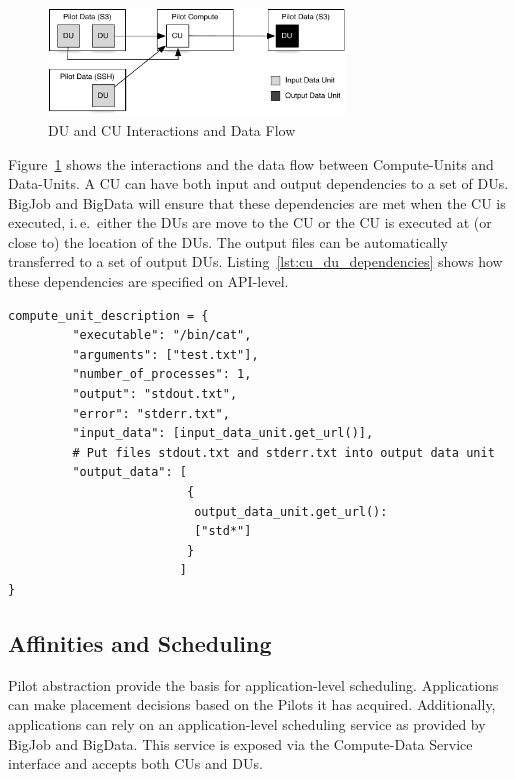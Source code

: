 \documentclass[times]{cpeauth}
\newcommand{\pilot}{Pilot\xspace}
\newcommand{\pilots}{Pilots\xspace}
\newcommand{\computedataservice}{Compute-Data Service\xspace}
\newcommand{\computeunit}{Compute-Unit\xspace}
\newcommand{\computeunits}{Compute-Units\xspace}
\newcommand{\dataunit}{Data-Unit\xspace}
\newcommand{\dataunits}{Data-Units\xspace}
\newcommand{\dus}{DUs\xspace}
\newcommand{\cu}{CU\xspace}
\newcommand{\cus}{CUs\xspace}
\begin{document}
\begin{figure}[htbp]
	\centering
		\includegraphics[width=0.7\textwidth]{figures/data-flow.pdf}
	\caption{DU and CU Interactions and Data Flow}
	\label{fig:figures_data-flow}
\end{figure}

Figure~\ref{fig:figures_data-flow} shows the interactions and the data flow
between \computeunits and \dataunits. A \cu can have both input and output
dependencies to a set of \dus. BigJob and BigData will ensure that these
dependencies are met when the \cu is executed, i.\,e.\ either the \dus are
move to the \cu or the \cu is executed at (or close to) the location of the
\dus. The output files can be automatically transferred to a set of output
\dus. Listing~\ref{lst:cu_du_dependencies} shows how these dependencies are
specified on API-level.

\begin{lstlisting}[caption={{Managing \dataunit/\computeunit Dependencies}}, style=myPythonListing, label={lst:cu_du_dependencies}, float=t]
compute_unit_description = {
         "executable": "/bin/cat",
         "arguments": ["test.txt"],
         "number_of_processes": 1,
         "output": "stdout.txt",
         "error": "stderr.txt",   
         "input_data": [input_data_unit.get_url()],
         # Put files stdout.txt and stderr.txt into output data unit
         "output_data": [
                         {
                          output_data_unit.get_url(): 
                          ["std*"]
                         }
                        ]    
}
\end{lstlisting}


\subsection{Affinities and Scheduling}

\pilot abstraction provide the basis for application-level scheduling. 
Applications can make placement decisions based on the \pilots it has 
acquired. Additionally, applications can rely on an application-level 
scheduling service as provided by BigJob and BigData. This service is exposed 
via the \computedataservice interface and accepts both \cus and \dus.
\end{document}
